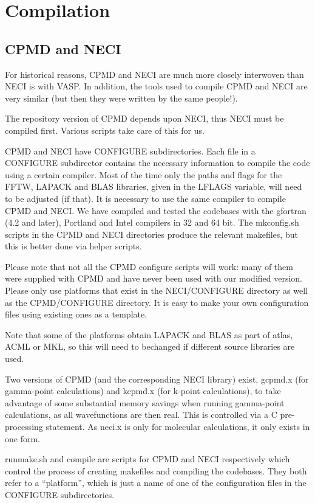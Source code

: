 \documentclass[openany,a4paper,10pt]{manual}
\begin{document}
\section{Compilation}


\subsection{CPMD and NECI}

For historical reasons, CPMD and NECI are much more closely interwoven
than NECI is with VASP.  In addition, the tools used to compile CPMD and
NECI are very similar (but then they were written by the same people!).

The repository version of CPMD depends upon NECI, thus NECI must be
compiled first.  Various scripts take care of this for us.

CPMD and NECI have CONFIGURE subdirectories.  Each file in a CONFIGURE
subdirector contains the necessary information to compile the code using
a certain compiler.  Most of the time only the paths and flags for the
FFTW, LAPACK and BLAS libraries, given in the LFLAGS variable, will need
to be adjusted (if that).  It is necessary to use the same compiler to
compile CPMD and NECI.  We have compiled and tested the codebases with the
gfortran (4.2 and later), Portland and Intel compilers in 32 and 64 bit.
The mkconfig.sh scripts in the CPMD and NECI directories produce the
relevant makefiles, but this is better done via helper scripts.

Please note that not all the CPMD configure scripts will work: many of
them were supplied with CPMD and have never been used with our modified
version.  Please only use platforms that exist in the NECI/CONFIGURE
directory as well as the CPMD/CONFIGURE directory.  It is easy to make
your own configuration files using existing ones as a template.

Note that some of the platforms obtain LAPACK and BLAS as part of atlas,
ACML or MKL, so this will need to bechanged if different source libraries
are used.

Two versions of CPMD (and the corresponding NECI library) exist, gcpmd.x
(for gamma-point calculations) and kcpmd.x (for k-point calculations),
to take advantage of some substantial memory savings when running
gamma-point calculations, as all wavefunctions are then real.  This is
controlled via a C pre-processing statement.  As neci.x is only for
molecular calculations, it only exists in one form.

runmake.sh and compile are scripts for CPMD and NECI respectively which
control the process of creating makefiles and compiling the codebases.
They both refer to a ``platform'', which is just a name of one of the
configuration files in the CONFIGURE subdirectories.
\end{document}
